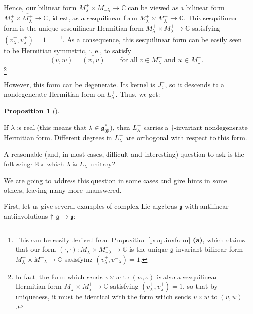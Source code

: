 \documentclass
[numbers=enddot,12pt,final,onecolumn,german,notitlepage]{scrartcl}%
\theoremstyle{definition}
\newtheorem{prop}[theo]{Proposition}
\newenvironment{proposition}[1][]
{\begin{prop}[#1]\begin{leftbar}}
{\end{leftbar}\end{prop}}
\begin{document}
Hence, our bilinear form $M_{\lambda}^{+}\times M_{-\lambda}^{-}%
\rightarrow\mathbb{C}$ can be viewed as a bilinear form $M_{\lambda}^{+}%
\times\overline{M_{\lambda}^{+}}\rightarrow\mathbb{C}$, id est, as a
sesquilinear form $M_{\lambda}^{+}\times M_{\lambda}^{+}\rightarrow\mathbb{C}%
$. This sesquilinear form is the unique sesquilinear Hermitian form
$M_{\lambda}^{+}\times M_{\lambda}^{+}\rightarrow\mathbb{C}$ satisfying
$\left(  v_{\lambda}^{+},v_{\lambda}^{+}\right)  =1$\ \ \ \ \footnote{This can
be easily derived from Proposition \ref{prop.invform} \textbf{(a)}, which
claims that our form $\left(  \cdot,\cdot\right)  :M_{\lambda}^{+}\times
M_{-\lambda}^{-}\rightarrow\mathbb{C}$ is the unique $\mathfrak{g}$-invariant
bilinear form $M_{\lambda}^{+}\times M_{-\lambda}^{-}\rightarrow\mathbb{C}$
satisfying $\left(  v_{\lambda}^{+},v_{-\lambda}^{-}\right)  =1$.}. As a
consequence, this sesquilinear form can be easily seen to be Hermitian
symmetric, i. e., to satisfy%
\[
\left(  v,w\right)  =\overline{\left(  w,v\right)  }%
\ \ \ \ \ \ \ \ \ \ \text{for all }v\in M_{\lambda}^{+}\text{ and }w\in
M_{\lambda}^{+}.
\]
\footnote{In fact, the form which sends $v\times w$ to $\overline{\left(
w,v\right)  }$ is also a sesquilinear Hermitian form $M_{\lambda}^{+}\times
M_{\lambda}^{+}\rightarrow\mathbb{C}$ satisfying $\left(  v_{\lambda}%
^{+},v_{\lambda}^{+}\right)  =1$, so that by uniqueness, it must be identical
with the form which sends $v\times w$ to $\left(  v,w\right)  $.}

However, this form can be degenerate. Its kernel is $J_{\lambda}^{+}$, so it
descends to a nondegenerate Hermitian form on $L_{\lambda}^{+}$. Thus, we get:

\begin{proposition}
If $\lambda$ is real (this means that $\lambda\in\mathfrak{g}_{0\mathbb{R}%
}^{\ast}$), then $L_{\lambda}^{+}$ carries a $\dag$-invariant nondegenerate
Hermitian form. Different degrees in $L_{\lambda}^{+}$ are orthogonal with
respect to this form.
\end{proposition}

A reasonable (and, in most cases, difficult and interesting) question to ask
is the following: For which $\lambda$ is $L_{\lambda}^{+}$ unitary?

We are going to address this question in some cases and give hints in some
others, leaving many more unanswered.

First, let us give several examples of complex Lie algebras $\mathfrak{g}$
with antilinear antiinvolutions $\dag:\mathfrak{g}\rightarrow\mathfrak{g}$:
\end{document}
